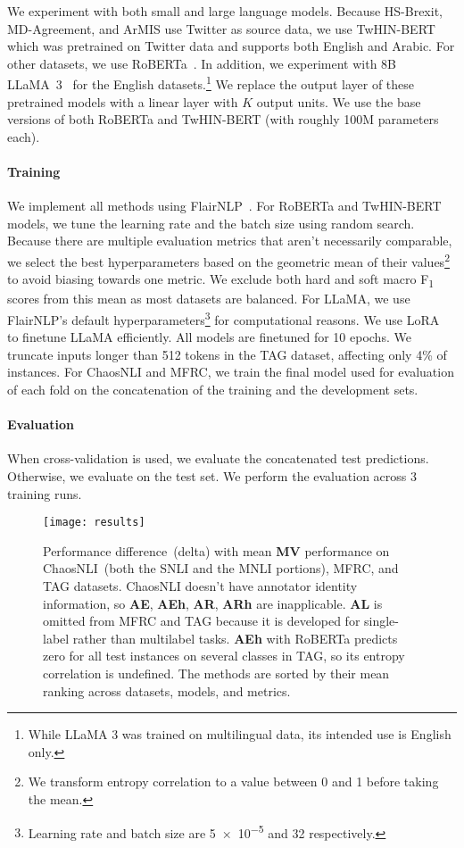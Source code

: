 \documentclass[shortpaper]{clv2025}
\newcommand{\methname}[1]{\textbf{#1}}  %
\begin{document}
We experiment with both small and large language models.
Because HS-Brexit, MD-Agreement, and ArMIS use Twitter as source data, we
use TwHIN-BERT~\citep{zhang2023a} which was pretrained on Twitter data and
supports both English and Arabic. For other datasets, we use
RoBERTa~\citep{liu2019h}. In addition, we experiment with
8B LLaMA~3~\citep{grattafiori2024a} for the English datasets.\footnote{While LLaMA 3
  was trained on multilingual data, its intended use is English only.} We
replace the output layer of these pretrained models with a linear layer with $K$
output units. We use the base versions of both RoBERTa and TwHIN-BERT (with roughly 100M parameters each).

\paragraph{Training}

We implement all methods using FlairNLP~\citep{akbik2019}. For RoBERTa and
TwHIN-BERT models, we tune the learning rate and the batch size using random
search. Because there are multiple evaluation metrics that aren't necessarily
comparable, we select the best hyperparameters based on the geometric mean of
their values\footnote{We transform entropy correlation to a value between 0 and
  1 before taking the mean.} to avoid biasing towards one metric. We exclude
both hard and soft macro F\textsubscript{1} scores from this mean as most
datasets are balanced.
For LLaMA, we use FlairNLP's default hyperparameters\footnote{Learning rate and
  batch size are \num{5e-5} and 32 respectively.} for computational reasons. We
use LoRA~\citep{hu2022} to finetune LLaMA efficiently. All models are finetuned
for 10 epochs. We truncate inputs longer than 512 tokens in the TAG dataset,
affecting only 4\% of instances.
For ChaosNLI and MFRC, we train the final model used for evaluation of each fold
on the concatenation of the training and the development sets.

\paragraph{Evaluation}

When cross-validation is used, we evaluate the concatenated test predictions.
Otherwise, we evaluate on the test set. We perform the evaluation across 3
training runs.

\begin{figure*}
  \centering
  \texttt{[image: results]}
  \caption{Performance difference~(delta) with mean \methname{MV} performance on
    ChaosNLI~(both the SNLI and the MNLI portions), MFRC, and TAG datasets.
    ChaosNLI doesn't have annotator identity information, so \methname{AE},
    \methname{AEh}, \methname{AR}, \methname{ARh} are inapplicable.
    \methname{AL} is omitted from MFRC and TAG because it is developed for
    single-label rather than multilabel tasks. \methname{AEh} with RoBERTa
    predicts zero for all test instances on several classes in TAG, so its
    entropy correlation is undefined. The methods are sorted by their mean
    ranking across datasets, models, and metrics.}\label{fig:delta-mv-results}
\end{figure*}
\end{document}
